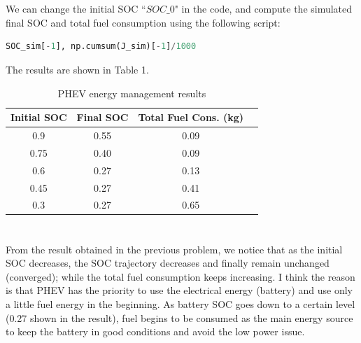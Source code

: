 \documentclass[12pt]{article}
\begin{document}
\section{}
We can change the initial SOC ``$SOC\_0$" in the code, and compute the simulated final SOC and total fuel consumption using the following script:
\begin{lstlisting}[language=Python]
SOC_sim[-1], np.cumsum(J_sim)[-1]/1000
\end{lstlisting}
The results are shown in Table 1.
\begin{table}[H]
	\caption{PHEV energy management results}
	\centering
	\begin{tabular}{cccc}
		\hline\hline
		\textbf{Initial SOC}&\textbf{Final SOC}&\textbf{Total Fuel Cons. (kg)}\\
		\hline
		0.9&0.55&0.09\\
		0.75&0.40&0.09\\
		0.6&0.27&0.13\\
		0.45&0.27&0.41\\
		0.3&0.27&0.65\\
		\hline\hline
	\end{tabular}
\end{table}
\section{}
From the result obtained in the previous problem, we notice that as the initial SOC decreases, the SOC trajectory decreases and finally remain unchanged (converged); while the total fuel consumption keeps increasing. I think the reason is that PHEV has the priority to use the electrical energy (battery) and use only a little fuel energy in the beginning. As battery SOC goes down to a certain level (0.27 shown in the result), fuel begins to be consumed as the main energy source to keep the battery in good conditions and avoid the low power issue.
\end{document}
